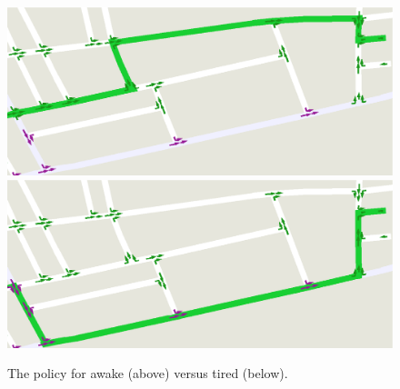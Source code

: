 \begin{figure}%
\begin{center}
    \includegraphics[width=0.75\linewidth]{awake.eps} \\
    \includegraphics[width=0.75\linewidth]{tired.eps}
    \caption{The policy for awake (above) versus tired (below).}
    \label{fig:example_policy}
\end{center}
\end{figure}




